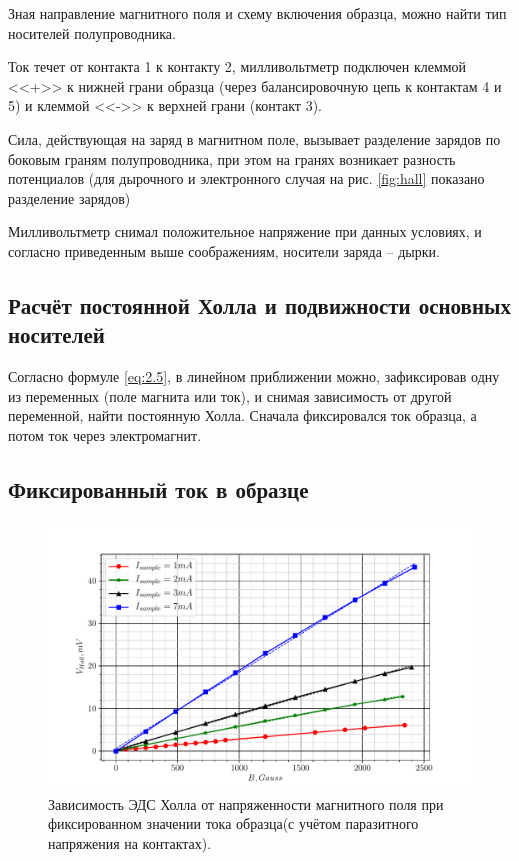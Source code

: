 Зная направление магнитного поля и схему включения образца, можно найти тип носителей полупроводника.

Ток течет от контакта 1 к контакту 2, милливольтметр подключен клеммой <<+>> к нижней грани образца (через балансировочную цепь к контактам 4 и 5) и клеммой
<<->> к верхней грани (контакт 3). 

Сила, действующая на заряд в магнитном поле, вызывает разделение зарядов по боковым граням полупроводника, при этом на
гранях возникает разность потенциалов (для дырочного и электронного случая на рис. \ref{fig:hall} показано разделение
зарядов)

Милливольтметр снимал положительное напряжение при данных условиях, и согласно приведенным выше соображениям, носители заряда -- дырки.

\subsection*{Расчёт постоянной Холла и подвижности основных носителей}
Согласно формуле \eqref{eq:2.5}, в линейном приближении можно, зафиксировав одну из переменных (поле магнита или ток), и
снимая зависимость от другой переменной, найти постоянную Холла. Сначала фиксировался ток образца, а потом ток через электромагнит.
\subsection*{Фиксированный ток в образце}
\begin{figure}[H]
	\centering
	\includegraphics[width = .98\linewidth]{graphs/cc.pdf}
	\caption{Зависимость ЭДС Холла от напряженности магнитного поля при фиксированном значении тока образца(с учётом паразитного напряжения на контактах).}
	\label{fig:5.5}
\end{figure}

